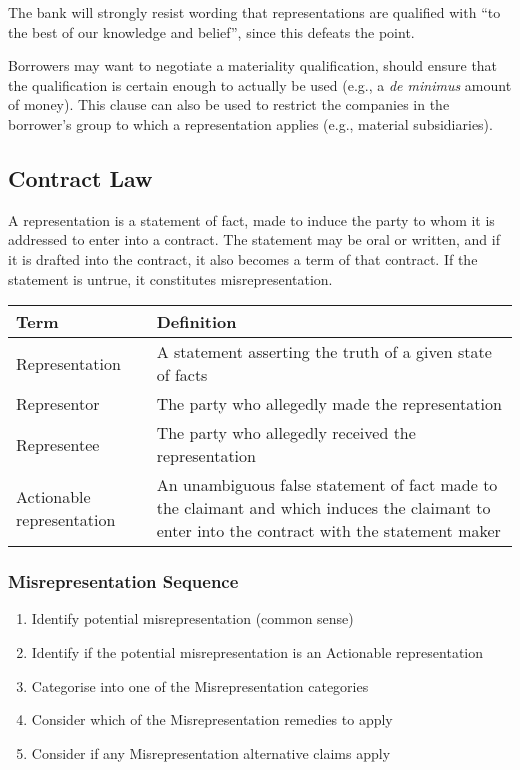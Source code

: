 \documentclass[
]{article}
\providecommand{\tightlist}{%
  \setlength{\itemsep}{0pt}\setlength{\parskip}{0pt}}
\begin{document}
The bank will strongly resist wording that representations are qualified
with ``to the best of our knowledge and belief'', since this defeats the
point.

Borrowers may want to negotiate a materiality qualification, should
ensure that the qualification is certain enough to actually be used
(e.g., a \emph{de minimus} amount of money). This clause can also be
used to restrict the companies in the borrower's group to which a
representation applies (e.g., material subsidiaries).

\hypertarget{contract-law}{%
\subsection{Contract Law}\label{contract-law}}

A representation is a statement of fact, made to induce the party to
whom it is addressed to enter into a contract. The statement may be oral
or written, and if it is drafted into the contract, it also becomes a
term of that contract. If the statement is untrue, it constitutes
misrepresentation.

\begin{longtable}[]{@{}ll@{}}
\toprule()
Term & Definition \\
\midrule()
\endhead
Representation & A statement asserting the truth of a given state of
facts \\
Representor & The party who allegedly made the representation \\
Representee & The party who allegedly received the representation \\
Actionable representation & An unambiguous false statement of fact made
to the claimant and which induces the claimant to enter into the
contract with the statement maker \\
\bottomrule()
\end{longtable}

\hypertarget{misrepresentation-sequence}{%
\subsubsection{Misrepresentation
Sequence}\label{misrepresentation-sequence}}

\begin{enumerate}
\tightlist
\item
  Identify potential misrepresentation (common sense)
\item
  Identify if the potential misrepresentation is an Actionable
  representation
\item
  Categorise into one of the Misrepresentation categories
\item
  Consider which of the Misrepresentation remedies to apply
\item
  Consider if any Misrepresentation alternative claims apply
\end{enumerate}
\end{document}
